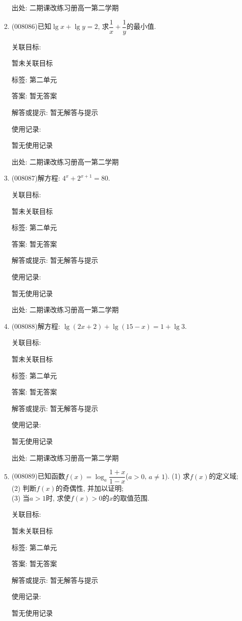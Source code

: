 \documentclass[10pt,a4paper]{article}
\begin{document}
\begin{enumerate}[1.]
出处: 二期课改练习册高一第二学期
\item { (008086)}已知$\lg x+\lg y=2$, 求$\dfrac 1x+\dfrac 1y$的最小值.


关联目标:

暂未关联目标



标签: 第二单元

答案: 暂无答案

解答或提示: 暂无解答与提示

使用记录:

暂无使用记录


出处: 二期课改练习册高一第二学期
\item { (008087)}解方程: $4^x+2^{x+1}=80$.


关联目标:

暂未关联目标



标签: 第二单元

答案: 暂无答案

解答或提示: 暂无解答与提示

使用记录:

暂无使用记录


出处: 二期课改练习册高一第二学期
\item { (008088)}解方程: $\lg (2x+2)+\lg (15-x)=1+\lg 3$.


关联目标:

暂未关联目标



标签: 第二单元

答案: 暂无答案

解答或提示: 暂无解答与提示

使用记录:

暂无使用记录


出处: 二期课改练习册高一第二学期
\item { (008089)}已知函数$f(x)=\log _a\dfrac{1+x}{1-x}$($a>0$, $a\ne 1$).
(1) 求$f(x)$的定义域;\\
(2) 判断$f(x)$的奇偶性, 并加以证明;\\
(3) 当$a>1$时, 求使$f(x)>0$的$x$的取值范围.


关联目标:

暂未关联目标



标签: 第二单元

答案: 暂无答案

解答或提示: 暂无解答与提示

使用记录:

暂无使用记录



\end{enumerate}
\end{document}
